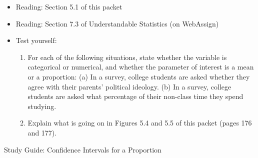 \documentclass[11pt]{article}
\begin{document}
{\it
\vspace{-0.5cm}
\begin{itemize}
\renewcommand{\labelitemi}{{$\ast$}}
\item Reading: Section 5.1 of this packet 
\item Reading: Section 7.3 of Understandable Statistics (on WebAssign)
\item Test yourself: 
{\small
\begin{enumerate}
\item For each of the following situations, state whether the variable is categorical or numerical, and whether the parameter of interest is a mean or a proportion: (a) In a survey, college students are asked whether they agree with their parents' political ideology.  (b) In a survey, college students are asked what percentage of their non-class time they spend studying.
\item Explain what is going on in Figures 5.4 and 5.5 of this packet (pages 176 and 177).
\end{enumerate}
}
\end{itemize}
}

\noindent
{\Large Study Guide: Confidence Intervals for a Proportion}
\end{document}
